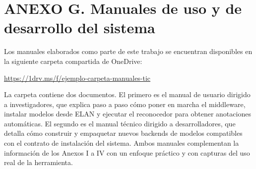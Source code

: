 
\section*{\normalfont ANEXO G. Manuales de uso y de desarrollo del sistema}
\label{anx:manuales}

Los manuales elaborados como parte de este trabajo se encuentran disponibles en la siguiente carpeta compartida de OneDrive:

\begin{center}
\url{https://1drv.ms/f/ejemplo-carpeta-manuales-tic}
\end{center}

La carpeta contiene dos documentos. El primero es el manual de usuario dirigido a investigadores, que explica paso a paso cómo poner en marcha el middleware, instalar modelos desde ELAN y ejecutar el reconocedor para obtener anotaciones automáticas. El segundo es el manual técnico dirigido a desarrolladores, que detalla cómo construir y empaquetar nuevos backends de modelos compatibles con el contrato de instalación del sistema. Ambos manuales complementan la información de los Anexos I a IV con un enfoque práctico y con capturas del uso real de la herramienta.
